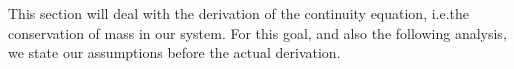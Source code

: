 This section will deal with the derivation of the continuity equation, i.e.\@ the conservation of mass in our system.
For this goal, and also the following analysis, we state our assumptions before the actual derivation.
 
